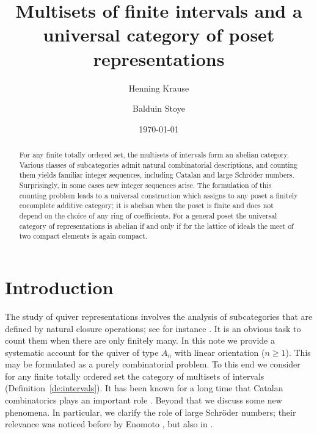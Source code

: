 \documentclass[a4paper]{amsart}
\title[Multisets of finite intervals]{Multisets of finite intervals and a
  universal category of poset representations}
\author{Henning Krause}
\author{Balduin Stoye}
\theoremstyle{plain}
\theoremstyle{definition}
\theoremstyle{remark}
\numberwithin{equation}{section}
\begin{document}
\begin{abstract}
  For any finite totally ordered set, the multisets of intervals form
  an abelian category. Various classes of subcategories admit natural
  combinatorial descriptions, and counting them yields familiar
  integer sequences, including Catalan and large Schröder
  numbers. Surprisingly, in some cases new integer sequences
  arise. The formulation of this counting problem leads to a universal
  construction which assigns to any poset a finitely cocomplete
  additive category; it is abelian when the poset is finite and does
  not depend on the choice of any ring of coefficients. For a general
  poset the universal category of representations is abelian if and
  only if for the lattice of ideals the meet of two compact elements
  is again compact.
\end{abstract}



\date{\today}

\maketitle

\setcounter{tocdepth}{1}
\tableofcontents

\section{Introduction}

The study of quiver representations involves the analysis of
subcategories that are defined by natural closure operations; see for
instance \cite{BK2004,IT2009,ONFR2015, ORT2015,Th2012}. It is an
obvious task to count them when there are only finitely many.  In this
note we provide a systematic account for the quiver of type $A_n$ with
linear orientation ($n\ge 1$). This may be formulated as a purely
combinatorial problem. To this end we consider for any finite totally
ordered set the category of multisets of intervals
(Definition~\ref{de:intervals}). It has been known for a long time
that Catalan combinatorics plays an important role \cite{Ga1981}.
Beyond that we discuss some new phenomena. In particular, we clarify
the role of large Schröder numbers; their relevance was noticed before
by Enomoto \cite{En2021,En2022}, but also in \cite{CFR2013,Ro2021}.
\end{document}
